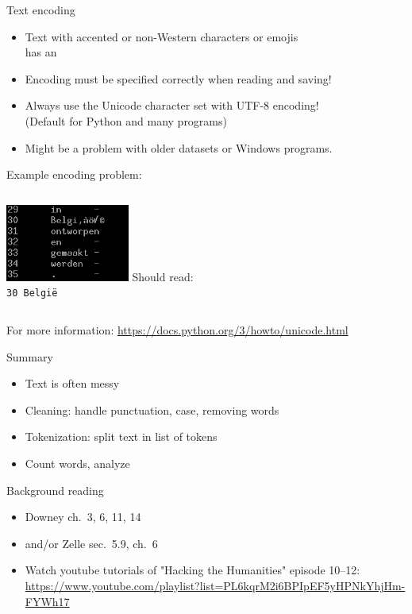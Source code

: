 \documentclass[aspectratio=169,usenames,dvipsnames]{beamer}
\begin{document}
\begin{frame}{Text encoding}
    \begin{itemize}
        \item Text with accented or non-Western characters or emojis \\
            has an 
        \item Encoding must be specified correctly when reading and saving!
        \item Always use the Unicode character set with UTF-8 encoding! \\
            (Default for Python and many programs)
        \item Might be a problem with older datasets or Windows programs.
    \end{itemize}
  
    Example encoding problem:

    \begin{columns}
    \centering
         \includegraphics[width=0.5\textwidth]{fig/encodingissue}
        Should read:\\
        \texttt{30   Belgi\"e}
        \vspace{3em}
    \end{columns}

    \vspace{1em}
    For more information: \url{https://docs.python.org/3/howto/unicode.html}
\end{frame}

\begin{frame}{Summary}
    \begin{itemize}
        \item Text is often messy
        \item Cleaning: handle punctuation, case, removing words
        \item Tokenization: split text in list of tokens
        \item Count words, analyze
    \end{itemize}
\end{frame}

\begin{frame}{Background reading}
    \begin{itemize}
        \item Downey ch.\ 3, 6, 11, 14
        \item and/or Zelle sec.\ 5.9, ch.\ 6
        \item Watch youtube tutorials of "Hacking the Humanities" episode 10--12:
            {\small \url{https://www.youtube.com/playlist?list=PL6kqrM2i6BPIpEF5yHPNkYhjHm-FYWh17}}
    \end{itemize}
\end{frame}
\end{document}
